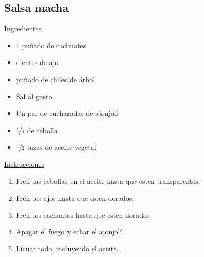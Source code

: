 \subsection{Salsa macha}

\underline{Ingredientes}
\begin{itemize}
\item 1 puñado de cachuates
\item {} dientes de ajo
\item {} puñado de chiles de árbol
\item \Sim Sal al gusto
\item Un par de cucharadas de ajonjoli
\item \Sim $\sfrac{1}{4}$ de cebolla
\item {}$\sfrac{1}{2}$ tazas de aceite vegetal
\end{itemize}

\underline{Instrucciones}
\begin{enumerate}
\item Freir las cebollas en el aceite hasta que esten transparentes.
\item Freir los ajos hasta que esten dorados.
\item Freir los cachuates hasta que esten dorados
\item Apagar el fuego y echar el ajonjolí.
\item Licuar todo, incluyendo el aceite. 
\end{enumerate}

